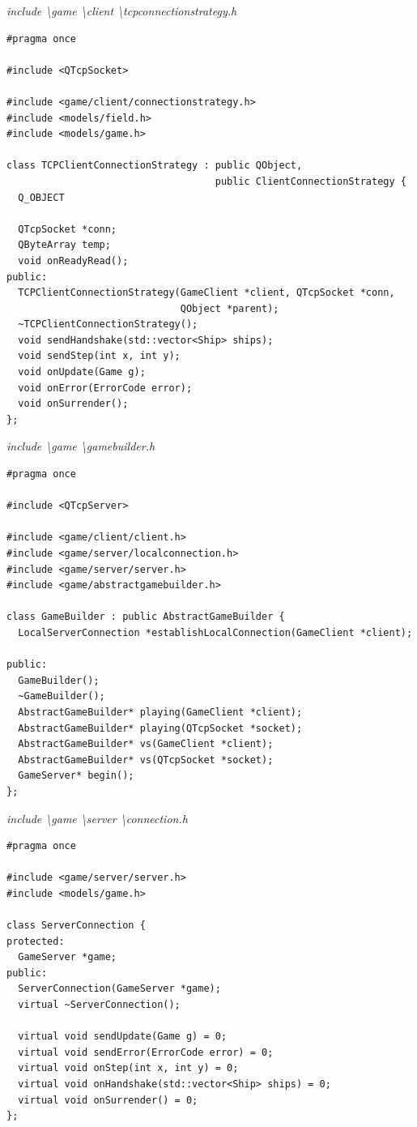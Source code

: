 \documentclass[a4paper,14pt]{extarticle}
\begin{document}
\textit{include \textbackslash game \textbackslash client \textbackslash tcpconnectionstrategy.h}
\begin{verbatim}
#pragma once

#include <QTcpSocket>

#include <game/client/connectionstrategy.h>
#include <models/field.h>
#include <models/game.h>

class TCPClientConnectionStrategy : public QObject,
                                    public ClientConnectionStrategy {
  Q_OBJECT

  QTcpSocket *conn;
  QByteArray temp;
  void onReadyRead();
public:
  TCPClientConnectionStrategy(GameClient *client, QTcpSocket *conn,
                              QObject *parent);
  ~TCPClientConnectionStrategy();
  void sendHandshake(std::vector<Ship> ships);
  void sendStep(int x, int y);
  void onUpdate(Game g);
  void onError(ErrorCode error);
  void onSurrender();
};

\end{verbatim}
\textit{include \textbackslash game \textbackslash gamebuilder.h}
\begin{verbatim}
#pragma once

#include <QTcpServer>

#include <game/client/client.h>
#include <game/server/localconnection.h>
#include <game/server/server.h>
#include <game/abstractgamebuilder.h>

class GameBuilder : public AbstractGameBuilder {
  LocalServerConnection *establishLocalConnection(GameClient *client);

public:
  GameBuilder();
  ~GameBuilder();
  AbstractGameBuilder* playing(GameClient *client);
  AbstractGameBuilder* playing(QTcpSocket *socket);
  AbstractGameBuilder* vs(GameClient *client);
  AbstractGameBuilder* vs(QTcpSocket *socket);
  GameServer* begin();
};

\end{verbatim}
\textit{include \textbackslash game \textbackslash server \textbackslash connection.h}
\begin{verbatim}
#pragma once

#include <game/server/server.h>
#include <models/game.h>

class ServerConnection {
protected:
  GameServer *game;
public:
  ServerConnection(GameServer *game);
  virtual ~ServerConnection();

  virtual void sendUpdate(Game g) = 0;
  virtual void sendError(ErrorCode error) = 0;
  virtual void onStep(int x, int y) = 0;
  virtual void onHandshake(std::vector<Ship> ships) = 0;
  virtual void onSurrender() = 0;
};

\end{verbatim}
\end{document}
